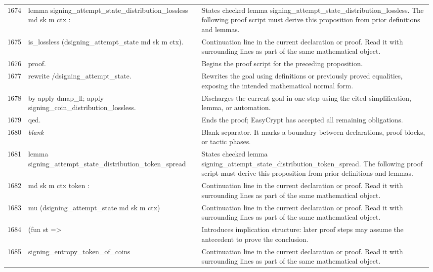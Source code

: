 \documentclass[10pt]{article}
\begin{document}
\begin{longtable}{r L{0.53\textwidth} L{0.37\textwidth}}
1674 & {\ttfamily\scriptsize lemma signing\_attempt\_state\_distribution\_lossless md sk m ctx :} & States checked lemma signing\_attempt\_state\_distribution\_lossless.  The following proof script must derive this proposition from prior definitions and lemmas. \\
1675 & {\ttfamily\scriptsize   is\_lossless (dsigning\_attempt\_state md sk m ctx).} & Continuation line in the current declaration or proof.  Read it with surrounding lines as part of the same mathematical object. \\
1676 & {\ttfamily\scriptsize proof.} & Begins the proof script for the preceding proposition. \\
1677 & {\ttfamily\scriptsize rewrite /dsigning\_attempt\_state.} & Rewrites the goal using definitions or previously proved equalities, exposing the intended mathematical normal form. \\
1678 & {\ttfamily\scriptsize by apply dmap\_ll; apply signing\_coin\_distribution\_lossless.} & Discharges the current goal in one step using the cited simplification, lemma, or automation. \\
1679 & {\ttfamily\scriptsize qed.} & Ends the proof; EasyCrypt has accepted all remaining obligations. \\
1680 & {\ttfamily\scriptsize \emph{blank}} & Blank separator.  It marks a boundary between declarations, proof blocks, or tactic phases. \\
1681 & {\ttfamily\scriptsize lemma signing\_attempt\_state\_distribution\_token\_spread} & States checked lemma signing\_attempt\_state\_distribution\_token\_spread.  The following proof script must derive this proposition from prior definitions and lemmas. \\
1682 & {\ttfamily\scriptsize   md sk m ctx token :} & Continuation line in the current declaration or proof.  Read it with surrounding lines as part of the same mathematical object. \\
1683 & {\ttfamily\scriptsize   mu (dsigning\_attempt\_state md sk m ctx)} & Continuation line in the current declaration or proof.  Read it with surrounding lines as part of the same mathematical object. \\
1684 & {\ttfamily\scriptsize     (fun st =>} & Introduces implication structure: later proof steps may assume the antecedent to prove the conclusion. \\
1685 & {\ttfamily\scriptsize       signing\_entropy\_token\_of\_coins} & Continuation line in the current declaration or proof.  Read it with surrounding lines as part of the same mathematical object. \\

\end{longtable}
\end{document}
